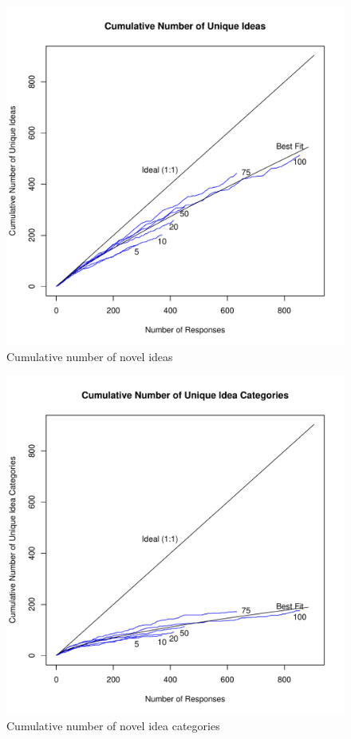\begin{figure}[h!]
    \centering
    \includegraphics[width=0.9\columnwidth]{cumulative_ideas}
    \caption{Cumulative number of novel ideas}
\end{figure}

\begin{figure}[h!]
    \centering
    \includegraphics[width=0.9\columnwidth]{cumulative_categories}
    \caption{Cumulative number of novel idea categories}
\end{figure}

